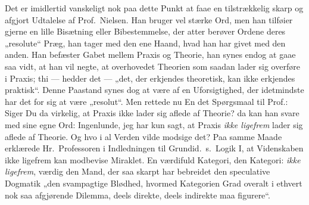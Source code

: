 Det er imidlertid vanskeligt nok paa dette Punkt at faae en tilstrækkelig skarp
og afgjort Udtalelse af Prof.\ Nielsen. Han bruger vel stærke Ord, men han
tilføier gjerne en lille Bisætning eller Bibestemmelse, der atter berøver
Ordene deres „resolute“ Præg, han tager med den ene Haand, hvad han har givet
med den anden. Han befæster Gabet mellem Praxis og Theorie, han synes endog at
gaae saa vidt, at han vil negte, at overhovedet Theorien som saadan lader sig
overføre i Praxis; thi --- hedder det --- „det, der erkjendes theoretisk, kan
ikke erkjendes praktisk“. Denne Paastand synes
dog at være af en Uforsigtighed, der idetmindste har det for sig at være
„resolut“. Men rettede nu En det Spørgsmaal til Prof.: Siger Du da virkelig, at
Praxis ikke lader sig aflede af Theorie? da kan han svare med sine egne Ord:
Ingenlunde, jeg har kun sagt, at Praxis \emph{ikke ligefrem} lader sig aflede
af Theorie. Og hvo i al Verden vilde modsige det? Paa
samme Maade erklærede Hr.\ Professoren i Indledningen til Grundid.\ s.\ Logik
I, at Videnskaben ikke ligefrem kan modbevise Miraklet. En værdifuld Kategori,
den
Kategori: \emph{ikke ligefrem}, værdig den Mand, der saa skarpt har
bebreidet den speculative Dogmatik „den svampagtige Blødhed, hvormed Kategorien
Grad overalt i ethvert nok saa afgjørende Dilemma, deels direkte, deels
indirekte maa figurere“.


